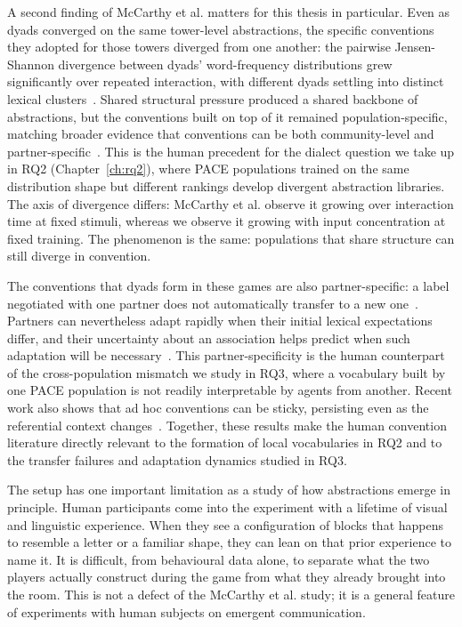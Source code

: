 A second finding of McCarthy et al. matters for this thesis in particular. Even as dyads converged on the same tower-level abstractions, the specific conventions they adopted for those towers diverged from one another: the pairwise Jensen-Shannon divergence between dyads' word-frequency distributions grew significantly over repeated interaction, with different dyads settling into distinct lexical clusters~\cite{mccarthy_learning_2021}. Shared structural pressure produced a shared backbone of abstractions, but the conventions built on top of it remained population-specific, matching broader evidence that conventions can be both community-level and partner-specific~\cite{hawkins_generalizing_2020}. This is the human precedent for the dialect question we take up in RQ2 (Chapter~\ref{ch:rq2}), where PACE populations trained on the same distribution shape but different rankings develop divergent abstraction libraries. The axis of divergence differs: McCarthy et al. observe it growing over interaction time at fixed stimuli, whereas we observe it growing with input concentration at fixed training. The phenomenon is the same: populations that share structure can still diverge in convention.

The conventions that dyads form in these games are also partner-specific: a label negotiated with one partner does not automatically transfer to a new one~\cite{ji_ad_2025,brennan_conceptual_1996}. Partners can nevertheless adapt rapidly when their initial lexical expectations differ, and their uncertainty about an association helps predict when such adaptation will be necessary~\cite{murthy_shades_2022}. This partner-specificity is the human counterpart of the cross-population mismatch we study in RQ3, where a vocabulary built by one PACE population is not readily interpretable by agents from another. Recent work also shows that ad hoc conventions can be sticky, persisting even as the referential context changes~\cite{ji_ad_2025}. Together, these results make the human convention literature directly relevant to the formation of local vocabularies in RQ2 and to the transfer failures and adaptation dynamics studied in RQ3.

The setup has one important limitation as a study of how abstractions emerge in principle. Human participants come into the experiment with a lifetime of visual and linguistic experience. When they see a configuration of blocks that happens to resemble a letter or a familiar shape, they can lean on that prior experience to name it. It is difficult, from behavioural data alone, to separate what the two players actually construct during the game from what they already brought into the room. This is not a defect of the McCarthy et al. study; it is a general feature of experiments with human subjects on emergent communication.

